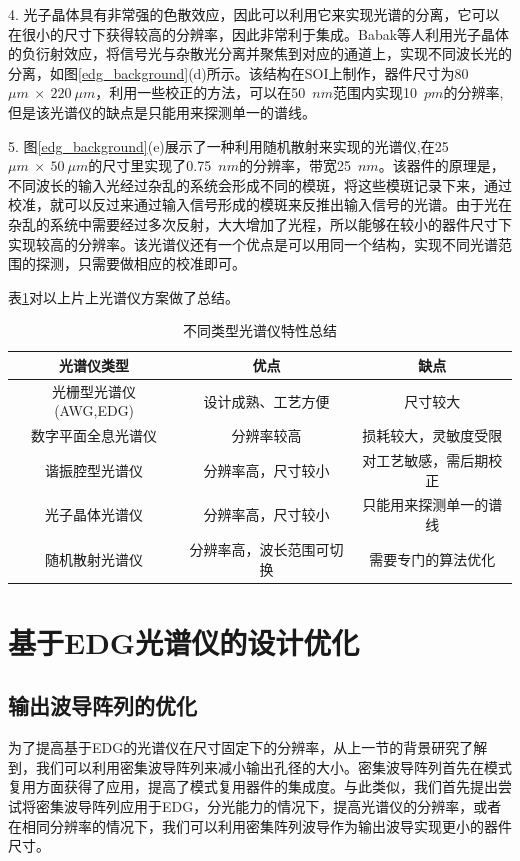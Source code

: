 4. 光子晶体具有非常强的色散效应，因此可以利用它来实现光谱的分离，它可以在很小的尺寸下获得较高的分辨率，因此非常利于集成。Babak等人利用光子晶体的负衍射效应，将信号光与杂散光分离并聚焦到对应的通道上，实现不同波长光的分离，如图\ref{edg_background}(d)所示。该结构在SOI上制作，器件尺寸为80~$\mu m~\times~220~\mu m$，利用一些校正的方法，可以在50~$nm$范围内实现10~$pm$的分辨率,但是该光谱仪的缺点是只能用来探测单一的谱线\cite{momeni2009integrated}。

5. 图\ref{edg_background}(e)展示了一种利用随机散射来实现的光谱仪,在25~$\mu m~\times~50~\mu m$的尺寸里实现了0.75~$nm$的分辨率，带宽25~$nm$\cite{redding2013compact}。该器件的原理是，不同波长的输入光经过杂乱的系统会形成不同的模斑，将这些模斑记录下来，通过校准，就可以反过来通过输入信号形成的模斑来反推出输入信号的光谱。由于光在杂乱的系统中需要经过多次反射，大大增加了光程，所以能够在较小的器件尺寸下实现较高的分辨率。该光谱仪还有一个优点是可以用同一个结构，实现不同光谱范围的探测，只需要做相应的校准即可。

表\ref{spectrometer_summary}对以上片上光谱仪方案做了总结。
\begin{table}[htb]
	\captionsetup{justification=centering}
	\caption{不同类型光谱仪特性总结}
	\label{spectrometer_summary}
	\centering
	\begin{tabular}[t]{|ccc|}
		\hline
		\textbf{光谱仪类型} & \textbf{优点} & \textbf{缺点}  \\
		\hline
		光栅型光谱仪(AWG,EDG)&设计成熟、工艺方便&尺寸较大\\
		\hline
		数字平面全息光谱仪&分辨率较高&损耗较大，灵敏度受限\\
		\hline
		谐振腔型光谱仪&分辨率高，尺寸较小&对工艺敏感，需后期校正\\
		\hline
		光子晶体光谱仪&分辨率高，尺寸较小&只能用来探测单一的谱线\\
		\hline
		随机散射光谱仪&分辨率高，波长范围可切换&需要专门的算法优化\\
		\hline
	\end{tabular}
\end{table}

\section{基于EDG光谱仪的设计优化}
\subsection{输出波导阵列的优化}
为了提高基于EDG的光谱仪在尺寸固定下的分辨率，从上一节的背景研究了解到，我们可以利用密集波导阵列来减小输出孔径的大小。密集波导阵列首先在模式复用方面获得了应用\cite{liu2015densely,chen2015experimental}，提高了模式复用器件的集成度。与此类似，我们首先提出尝试将密集波导阵列应用于EDG，分光能力的情况下，提高光谱仪的分辨率，或者在相同分辨率的情况下，我们可以利用密集阵列波导作为输出波导实现更小的器件尺寸。

